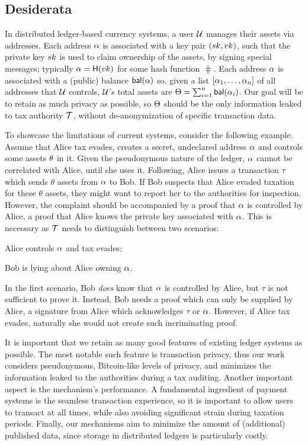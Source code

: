 \subsection{Desiderata}\label{sec:taxation}

In distributed ledger-based currency systems, a user $\mathcal{U}$ manages their
assets via addresses. Each address $\alpha$ is associated with a key pair
$(sk_{}, vk_{})$, such that the private key $sk$ is used to claim ownership of
the assets, \eg by signing special messages; typically $\alpha =
\mathsf{H}(vk)$ for some hash function $\hash$. Each address $\alpha$ is
associated with a (public) balance $\mathsf{bal}(\alpha)$ so, given a list
$[\alpha_1, \dots, \alpha_n]$ of all addresses that $\mathcal{U}$ controls,
$\mathcal{U}$'s total assets are $\Theta = \sum_{i=1}^n \mathsf{bal}(\alpha_i)$. Our
goal will be to retain as much privacy as possible, so $\Theta$ should be the
only information leaked to tax authority $\mathcal{T}$, without
de-anonymization of specific transaction data.

To showcase the limitations of current systems, consider the following example.
Assume that Alice tax evades, \ie creates a secret, undeclared address
$\alpha$ and controls some assets $\theta$ in it. Given the pseudonymous
nature of the ledger, $\alpha$ cannot be correlated with Alice, until she
uses it. Following, Alice issues a transaction $\tau$ which sends $\theta$
assets from $\alpha$ to Bob. If Bob suspects that Alice evaded taxation for
these $\theta$ assets, they might want to report her to the authorities for
inspection. However, the complaint should be accompanied by a proof that
$\alpha$ is controlled by Alice, \ie a proof that Alice knows the private key
associated with $\alpha$. This is necessary as $\mathcal{T}$ needs to
distinguish between two scenarios:
\begin{inparaenum}[i)]
    \item Alice controls $\alpha$ and tax evades;
    \item Bob is lying about Alice owning $\alpha$.
\end{inparaenum}
In the first scenario, Bob \emph{does} know that $\alpha$ is controlled by
Alice, but $\tau$ is not sufficient to prove it.
Instead, Bob needs a proof which can only be supplied by Alice, \eg a signature
from Alice which acknowledges $\tau$ or $\alpha$. However, if Alice tax
evades, naturally she would not create such incriminating proof.

It is important that we retain as many good features of existing ledger systems
as possible. The most notable such feature is transaction privacy, thus our
work considers pseudonymous, Bitcoin-like levels of privacy, and minimizes the
information leaked to the authorities during a tax auditing. Another important
aspect is the mechanism's performance. A fundamental ingredient of payment
systems is the seamless transaction experience, so it is important to allow
users to transact at all times, while also avoiding significant strain during
taxation periods. Finally, our mechanisms aim to minimize the amount of
(additional) published data, since storage in
distributed ledgers is particularly costly.

